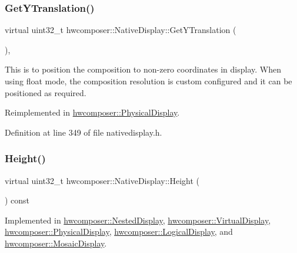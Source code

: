 \subsubsection{\texorpdfstring{Get\+Y\+Translation()}{GetYTranslation()}}
{\footnotesize\ttfamily virtual uint32\+\_\+t hwcomposer\+::\+Native\+Display\+::\+Get\+Y\+Translation (\begin{DoxyParamCaption}{ }\end{DoxyParamCaption})\hspace{0.3cm}{\ttfamily [inline]}, {\ttfamily [virtual]}}

This is to position the composition to non-\/zero coordinates in display. When using float mode, the composition resolution is custom configured and it can be positioned as required. 

Reimplemented in \mbox{\hyperlink{classhwcomposer_1_1PhysicalDisplay_a7c390445fe926da9b501187678d1cb04}{hwcomposer\+::\+Physical\+Display}}.



Definition at line 349 of file nativedisplay.\+h.


\begin{DoxyCode}{0}
\end{DoxyCode}
\mbox{\label{classhwcomposer_1_1NativeDisplay_a09a19377e64e1fed90ae8315a8e71864}} 
\subsubsection{\texorpdfstring{Height()}{Height()}}
{\footnotesize\ttfamily virtual uint32\+\_\+t hwcomposer\+::\+Native\+Display\+::\+Height (\begin{DoxyParamCaption}{ }\end{DoxyParamCaption}) const\hspace{0.3cm}{\ttfamily [pure virtual]}}



Implemented in \mbox{\hyperlink{classhwcomposer_1_1NestedDisplay_ad83400a54d34d803fd427d9dc17ca95f}{hwcomposer\+::\+Nested\+Display}}, \mbox{\hyperlink{classhwcomposer_1_1VirtualDisplay_a7136ba46d348b88dae1908a928e6ce2d}{hwcomposer\+::\+Virtual\+Display}}, \mbox{\hyperlink{classhwcomposer_1_1PhysicalDisplay_aa6f009efb2eb6733c2476696b54c9461}{hwcomposer\+::\+Physical\+Display}}, \mbox{\hyperlink{classhwcomposer_1_1LogicalDisplay_a8c687fb1727e18b8a74db9740eccca88}{hwcomposer\+::\+Logical\+Display}}, and \mbox{\hyperlink{classhwcomposer_1_1MosaicDisplay_af15fda20d779888c521095542b505f9d}{hwcomposer\+::\+Mosaic\+Display}}.

